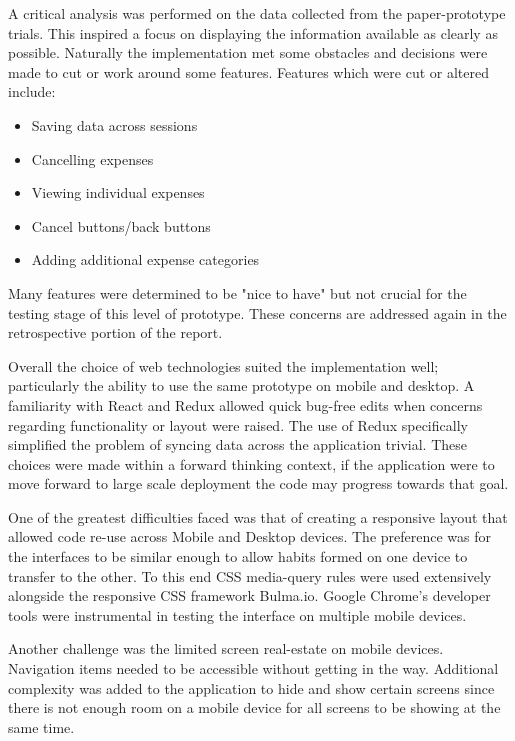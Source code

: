 \documentclass{chi2011}
\begin{document}
    A critical analysis was performed on the data collected from the
    paper-prototype trials. This inspired a focus on displaying the information
    available as clearly as possible. Naturally the implementation met some
    obstacles and decisions were made to cut or work around some features.
    Features which were cut or altered include:

    \begin{itemize}[noitemsep]
        \item Saving data across sessions
        \item Cancelling expenses
        \item Viewing individual expenses
        \item Cancel buttons/back buttons
        \item Adding additional expense categories
    \end{itemize}

    Many features were determined to be "nice to have" but not crucial for the
    testing stage of this level of prototype. These concerns are addressed
    again in the retrospective portion of the report.

    Overall the choice of web technologies suited the implementation well;
    particularly the ability to use the same prototype on mobile and desktop.
    A familiarity with React and Redux allowed quick bug-free edits when
    concerns regarding functionality or layout were raised. The use of Redux
    specifically simplified the problem of syncing data across the application
    trivial. These choices were made within a forward thinking context, if the
    application were to move forward to large scale deployment the code may
    progress towards that goal.

    One of the greatest difficulties faced was that of creating a responsive
    layout that allowed code re-use across Mobile and Desktop devices. The
    preference was for the interfaces to be similar enough to allow habits
    formed on one device to transfer to the other. To this end CSS media-query
    rules were used extensively alongside the responsive CSS framework
    Bulma.io. Google Chrome's developer tools were instrumental in testing
    the interface on multiple mobile devices.

    Another challenge was the limited screen real-estate on mobile devices.
    Navigation items needed to be accessible without getting in the way.
    Additional complexity was added to the application to hide and show certain
    screens since there is not enough room on a mobile device for all screens
    to be showing at the same time.
\end{document}
